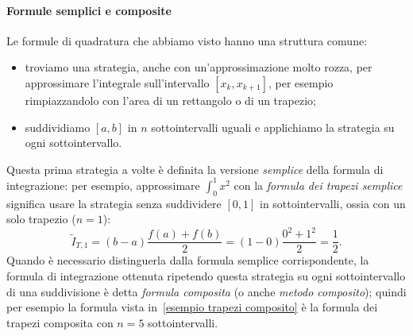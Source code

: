 \documentclass[a4paper]{report}
\theoremstyle{definiton}
\theoremstyle{remark}
\begin{document}
\paragraph{Formule semplici e composite}
Le formule di quadratura che abbiamo visto hanno una struttura comune:
\begin{itemize}
    \item troviamo una strategia, anche con un'approssimazione molto rozza, per approssimare l'integrale sull'intervallo $[x_k,x_{k+1}]$, per esempio rimpiazzandolo con l'area di un rettangolo o di un trapezio;
    \item suddividiamo $[a,b]$ in $n$ sottointervalli uguali e applichiamo la strategia su ogni sottointervallo.
\end{itemize}
Questa prima strategia a volte è definita la versione \emph{semplice} della formula di integrazione: per esempio, approssimare $\int_0^1 x^2$ con la \emph{formula dei trapezi semplice} significa usare la strategia senza suddividere $[0,1]$ in sottointervalli, ossia con un solo trapezio ($n=1$):
\[
\tilde{I}_{T,1} = (b-a)\frac{f(a)+f(b)}{2} = (1-0)\frac{0^2+1^2}{2} = \frac{1}{2}.
\]
Quando è necessario distinguerla dalla formula semplice corrispondente, la formula di integrazione ottenuta ripetendo questa strategia su ogni sottointervallo di una suddivisione è detta \emph{formula composita} (o anche \emph{metodo composito}); quindi per esempio la formula vista in~\eqref{esempio trapezi composito} è la formula dei trapezi composita con $n=5$ sottointervalli.
\end{document}
